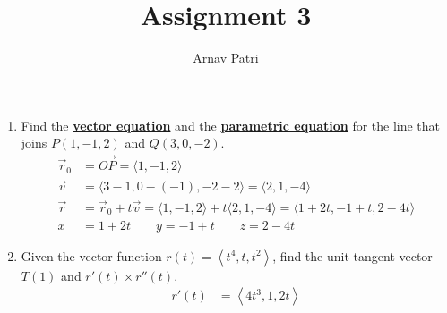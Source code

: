 \documentclass[12pt, A4]{article}
\title{Assignment 3}
\author{Arnav Patri}
\renewcommand{\Vec}[1]{\overrightarrow{#1}}
\begin{document}
	\maketitle
	\begin{enumerate}
		\item	
			Find the \textbf{\underline{vector equation}} and the \textbf{\underline{parametric equation}} for the line that joins $P(1, -1, 2)$ and $Q(3, 0, -2)$. \\
			\begin{align*}
				\vec{r}_0 &= \Vec{OP} 
						= \langle 1, -1, 2 \rangle \\
				\vec{v} &= \langle 3 - 1, 0 - (-1), -2 - 2 \rangle
						= \langle 2, 1, -4 \rangle \\
				\vec{r} &= \vec{r}_0 + t\vec{v}
						= \langle 1, -1, 2 \rangle + t\langle 2, 1, -4 \rangle
						= \langle 1 + 2t, -1 + t, 2 - 4t \rangle \\
				x &= 1 + 2t \qquad y = -1 + t \qquad z = 2-4t
			\end{align*}
		\item
			Given the vector function $r(t) = \left\langle t^4, t, t^2 \right\rangle$, find the unit tangent vector $T(1)$ and $r'(t) \times r''(t)$.
			\begin{align*}
				r'(t) &= \left\langle 4t^3, 1, 2t \right\rangle \\
			\end{align*}
	\end{enumerate}
\end{document}
